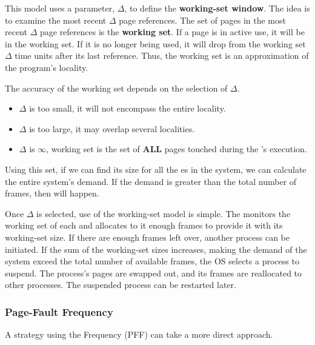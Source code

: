 This model uses a parameter, $\Delta$, to define the \textbf{working-set window}.
The idea is to examine the most recent $\Delta$ page references.
The set of pages in the most recent $\Delta$ page references is the \textbf{working set}.
If a page is in active use, it will be in the working set.
If it is no longer being used, it will drop from the working set $\Delta$ time units after its last reference.
Thus, the working set is an approximation of the program’s locality.

The accuracy of the working set depends on the selection of $\Delta$.
\begin{itemize}[noitemsep]
\item $\Delta$ is too small, it will not encompass the entire locality.
\item $\Delta$ is too large, it may overlap several localities.
\item $\Delta$ is $\infty$, working set is the set of \textbf{ALL} pages touched during the 's execution.
\end{itemize}

Using this set, if we can find its size for all the es in the system, we can calculate the entire system's demand.
If the demand is greater than the total number of frames, then  will happen.

Once $\Delta$ is selected, use of the working-set model is simple.
The  monitors the working set of each  and allocates to it enough frames to provide it with its working-set size.
If there are enough frames left over, another process can be initiated.
If the sum of the working-set sizes increases, making the demand of the system exceed the total number of available frames, the OS selects a process to suspend.
The process’s pages are swapped out, and its frames are reallocated to other processes.
The suspended process can be restarted later.

\subsubsection{Page-Fault Frequency}\label{subsubsec:Page_Fault_Frequency}
A strategy using the  Frequency (PFF) can take a more direct approach.

